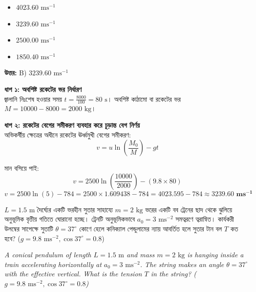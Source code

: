 \documentclass[12pt, a4paper]{article}
\begin{document}
{%
\begin{itemize}[label={}, leftmargin=1cm, itemsep=0.5em]
\item[\textbf{A)}] $4023.60\text{ ms}^{-1}$
\item[\textbf{B)}] $3239.60\text{ ms}^{-1}$
\item[\textbf{C)}] $2500.00\text{ ms}^{-1}$
\item[\textbf{D)}] $1850.40\text{ ms}^{-1}$
\end{itemize}
\vspace{0.5em}

\begin{tcolorbox}[answerbox]
\textbf{\color{success} উত্তর:} B) $3239.60\text{ ms}^{-1}$
\end{tcolorbox}
\vspace{1em}

\begin{tcolorbox}[solutionbox={সমাধান (Solution)}]
\noindent
\textbf{ধাপ ১: অবশিষ্ট রকেটের ভর নির্ধারণ} \\
জ্বালানি নিঃশেষ হওয়ার সময় $t = \frac{8000}{100} = 80\text{ s}$।
অবশিষ্ট কাঠামো বা রকেটের ভর $M = 10000 - 8000 = 2000\text{ kg}$।

\vspace{0.5em}
\noindent\textbf{ধাপ ২: রকেটের বেগের সমীকরণ ব্যবহার করে চূড়ান্ত বেগ নির্ণয়} \\
অভিকর্ষীয় ক্ষেত্রের অধীনে রকেটের ঊর্ধ্বমুখী বেগের সমীকরণ:
\[v = u \ln\left(\frac{M_0}{M}\right) - gt\]

মান বসিয়ে পাই:
\[v = 2500 \ln\left(\frac{10000}{2000}\right) - (9.8 \times 80)\]
\[v = 2500 \ln(5) - 784 = 2500 \times 1.609438 - 784 = 4023.595 - 784 \approx \mathbf{3239.60\text{ ms}^{-1}}\]
\end{tcolorbox}

\vspace{2em}

\begin{tcolorbox}[questionbox={প্রশ্ন (Question) 13}]
\noindent
$L = 1.5\text{ m}$ দৈর্ঘ্যের একটি ভরহীন সুতার সাহায্যে $m = 2\text{ kg}$ ভরের একটি বব ট্রেনের ছাদ থেকে ঝুলিয়ে অনুভূমিক বৃত্তীয় গতিতে ঘোরানো হচ্ছে। ট্রেনটি অনুভূমিকভাবে $a_0 = 3\text{ ms}^{-2}$ সমত্বরণে ত্বরান্বিত। কার্যকরী উলম্বের সাপেক্ষে সুতাটি $\theta = 37^\circ$ কোণে হেলে কনিক্যাল পেন্ডুলামের ন্যায় আবর্তিত হলে সুতার টান বল $T$ কত হবে? ($g = 9.8\text{ ms}^{-2}, \cos 37^\circ = 0.8$)
\vspace{0.8em}
\begin{english}
\noindent\textit{\color{darkgray}
A conical pendulum of length $L = 1.5\text{ m}$ and mass $m = 2\text{ kg}$ is hanging inside a train accelerating horizontally at $a_0 = 3\text{ ms}^{-2}$. The string makes an angle $\theta = 37^\circ$ with the effective vertical. What is the tension $T$ in the string? ($g = 9.8\text{ ms}^{-2}, \cos 37^\circ = 0.8$)
}
\end{english}
\end{tcolorbox}

}
\end{document}
